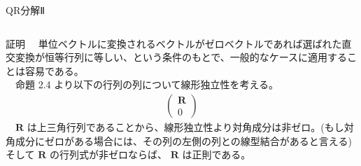 \documentclass[dvipdfmx,10pt,presentation]{beamer}
\begin{document}
\begin{frame}[label={sec:org635eea9}]{QR分解Ⅱ}
\begin{columns}
\begin{column}{1.00\columnwidth}
\begin{block}{証明}
　単位ベクトルに変換されるベクトルがゼロベクトルであれば選ばれた直交変換が恒等行列に等しい、という条件のもとで、一般的なケースに適用することは容易である。\\
　命題 2.4 より以下の行列の列について線形独立性を考える。\\
\begin{align*}
\begin{pmatrix}
\bm{R} \\
0
\end{pmatrix}
\end{align*}
　\(\bm{R}\) は上三角行列であることから、線形独立性より対角成分は非ゼロ。(もし対角成分にゼロがある場合には、その列の左側の列との線型結合があると言える) そして \(\bm{R}\) の行列式が非ゼロならば、 \(\bm{R}\) は正則である。\\
\end{block}
\end{column}
\end{columns}
\end{frame}
\end{document}
